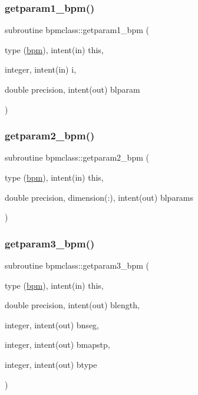 \subsubsection{\texorpdfstring{getparam1\_bpm()}{getparam1\_bpm()}}
{\footnotesize\ttfamily subroutine bpmclass\+::getparam1\+\_\+bpm (\begin{DoxyParamCaption}\item[{type (\mbox{\hyperlink{namespacebpmclass_structbpmclass_1_1bpm}{bpm}}), intent(in)}]{this,  }\item[{integer, intent(in)}]{i,  }\item[{double precision, intent(out)}]{blparam }\end{DoxyParamCaption})}

\mbox{\label{namespacebpmclass_ae88ec9feb4f283a3914a0859b14dc8dc}} 
\subsubsection{\texorpdfstring{getparam2\_bpm()}{getparam2\_bpm()}}
{\footnotesize\ttfamily subroutine bpmclass\+::getparam2\+\_\+bpm (\begin{DoxyParamCaption}\item[{type (\mbox{\hyperlink{namespacebpmclass_structbpmclass_1_1bpm}{bpm}}), intent(in)}]{this,  }\item[{double precision, dimension(\+:), intent(out)}]{blparams }\end{DoxyParamCaption})}

\mbox{\label{namespacebpmclass_a290f2f59ee0b68d7f56e678b87f43393}} 
\subsubsection{\texorpdfstring{getparam3\_bpm()}{getparam3\_bpm()}}
{\footnotesize\ttfamily subroutine bpmclass\+::getparam3\+\_\+bpm (\begin{DoxyParamCaption}\item[{type (\mbox{\hyperlink{namespacebpmclass_structbpmclass_1_1bpm}{bpm}}), intent(in)}]{this,  }\item[{double precision, intent(out)}]{blength,  }\item[{integer, intent(out)}]{bnseg,  }\item[{integer, intent(out)}]{bmapstp,  }\item[{integer, intent(out)}]{btype }\end{DoxyParamCaption})}

